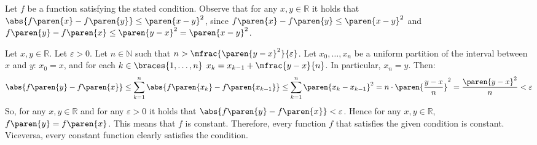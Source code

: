 Let $f$ be a function satisfying the stated condition.
Observe that for any $x, y \in \mathbb{R}$ it holds that
$\abs{f\paren{x} - f\paren{y}} \leq \paren{x - y}^{2}$,
since $f\paren{x} - f\paren{y} \leq \paren{x - y}^{2}$
and $f\paren{y} - f\paren{x} \leq \paren{y - x}^{2} = \paren{x - y}^{2}$.

Let $x, y \in \mathbb{R}$.
Let $\varepsilon > 0$.
Let $n \in \mathbb{N}$ such that
$n > \mfrac{\paren{y - x}^{2}}{\varepsilon}$.
Let $x_0, \dotsc, x_n$ be a uniform partition
of the interval between $x$ and $y$:
$x_0 = x$, and for each $k \in \braces{1, \dotsc, n}$
$x_k = x_{k-1} + \mfrac{y - x}{n}$.
In particular, $x_n = y$.
Then:
\begin{equation*}
  \abs{f\paren{y} - f\paren{x}}
  \leq \sum\limits_{k = 1}^{n} {\abs{f\paren{x_k} - f\paren{x_{k-1}}}}
  \leq \sum\limits_{k = 1}^{n} {\paren{x_k - x_{k-1}}^{2}}
  = n \cdot \paren{\frac{y - x}{n}}^{2}
  = \frac{\paren{y - x}^2}{n}
  < \varepsilon
\end{equation*}
So, for any $x, y \in \mathbb{R}$ and for any $\varepsilon > 0$
it holds that $\abs{f\paren{y} - f\paren{x}} < \varepsilon$.
Hence for any $x, y \in \mathbb{R}$, $f\paren{y} = f\paren{x}$.
This means that $f$ is constant.
Therefore, every function $f$ that satisfies the given condition is constant.
Viceversa, every constant function clearly satisfies the condition.
